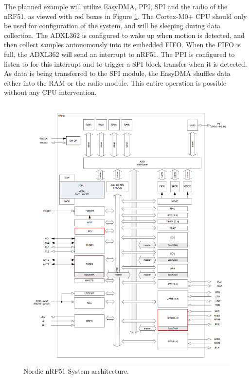 The planned example will utilize EasyDMA, PPI, SPI and the radio of the nRF51, as viewed with red boxes in Figure \ref{fig:accel_working_principle}. The Cortex-M0+ CPU should only be used for configuration of the system, and will be sleeping during data collection. The ADXL362 is configured to wake up when motion is detected, and then collect samples autonomously into its embedded FIFO. When the FIFO is full, the ADXL362 will send an interrupt to nRF51. The PPI is configured to listen to for this interrupt and to trigger a SPI block transfer when it is detected. As data is being transferred to the SPI module, the EasyDMA shuffles data either into the RAM or the radio module. This entire operation is possible without any CPU intervention.

\begin{figure}[h]
\centering
\includegraphics[scale=0.5]{fig/nrf51822_edit.png}
\caption{Nordic nRF51 System architecture. \cite{nRF51}}
\label{fig:accel_working_principle}
\end{figure}

